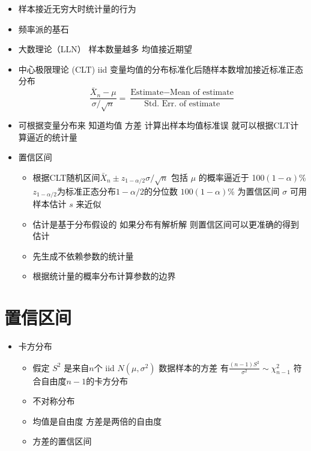 \documentclass[]{book}
\providecommand{\tightlist}{%
  \setlength{\itemsep}{0pt}\setlength{\parskip}{0pt}}
\begin{document}
\begin{itemize}
\tightlist
\item
  样本接近无穷大时统计量的行为
\item
  频率派的基石
\item
  大数理论（LLN） 样本数量越多 均值接近期望
\item
  中心极限理论 (CLT) iid 变量均值的分布标准化后随样本数增加接近标准正态分布
  \[
  \frac{\bar X_n - \mu}{\sigma / \sqrt{n}} = 
    \frac{\mbox{Estimate} - \mbox{Mean of estimate}}{\mbox{Std. Err. of estimate}}
  \]
\item
  可根据变量分布来 知道均值 方差 计算出样本均值标准误 就可以根据CLT计算逼近的统计量
\item
  置信区间

  \begin{itemize}
  \tightlist
  \item
    根据CLT随机区间\(\bar X_n \pm z_{1-\alpha/2}\sigma / \sqrt{n}\) 包括 \(\mu\) 的概率逼近于 100\((1-\alpha)\)\% \(z_{1-\alpha/2}\)为标准正态分布\(1-\alpha/2\)的分位数 \(100(1 - \alpha)\)\% 为置信区间 \(\sigma\) 可用样本估计 \(s\) 来近似
  \item
    估计是基于分布假设的 如果分布有解析解 则置信区间可以更准确的得到估计
  \item
    先生成不依赖参数的统计量
  \item
    根据统计量的概率分布计算参数的边界
  \end{itemize}
\end{itemize}

\hypertarget{ux7f6eux4fe1ux533aux95f4}{%
\section{置信区间}\label{ux7f6eux4fe1ux533aux95f4}}

\begin{itemize}
\tightlist
\item
  卡方分布

  \begin{itemize}
  \tightlist
  \item
    假定 \(S^2\) 是来自\(n\)个 iid \(N(\mu,\sigma^2)\) 数据样本的方差 有\(\frac{(n - 1) S^2}{\sigma^2} \sim \chi^2_{n-1}\) 符合自由度\(n-1\)的卡方分布
  \item
    不对称分布
  \item
    均值是自由度 方差是两倍的自由度
  \item
    方差的置信区间
  \end{itemize}
\end{itemize}
\end{document}
